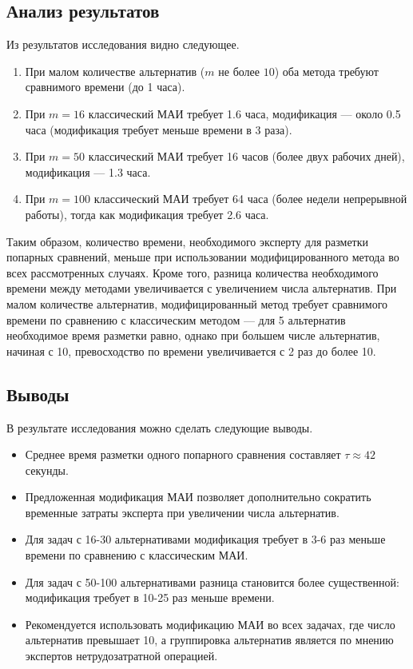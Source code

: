 \subsection{Анализ результатов}

Из результатов исследования видно следующее.
\begin{enumerate}
    \item При малом количестве альтернатив ($m$ не более $10$) оба метода требуют сравнимого времени (до 1 часа).
    \item При \(m = 16\) классический МАИ требует 1.6 часа, модификация --- около 0.5 часа (модификация требует меньше времени в 3 раза).
    \item При \(m = 50\) классический МАИ требует 16 часов (более двух рабочих дней), модификация --- 1.3 часа.
    \item При \(m = 100\) классический МАИ требует 64 часа (более недели непрерывной работы), тогда как модификация требует 2.6 часа.
\end{enumerate}

Таким образом, количество времени, необходимого эксперту для разметки попарных сравнений, меньше при использовании модифицированного метода во всех рассмотренных случаях.
Кроме того, разница количества необходимого времени между методами увеличивается с увеличением числа альтернатив.
При малом количестве альтернатив, модифицированный метод требует сравнимого времени по сравнению с классическим методом ---  для 5 альтернатив необходимое время разметки равно, однако при большем числе альтернатив, начиная с 10, превосходство по времени увеличивается с 2 раз до более 10.

\subsection*{Выводы}

В результате исследования можно сделать следующие выводы.

\begin{itemize}
    \item Среднее время разметки одного попарного сравнения составляет \(\tau \approx 42\) секунды.
    \item Предложенная модификация МАИ позволяет дополнительно сократить временные затраты эксперта при увеличении числа альтернатив.
    \item Для задач с 16-30 альтернативами модификация требует в 3-6 раз меньше времени по сравнению с классическим МАИ.
    \item Для задач с 50-100 альтернативами разница становится более существенной: модификация требует в 10-25 раз меньше времени.
    \item Рекомендуется использовать модификацию МАИ во всех задачах, где число альтернатив превышает 10, а группировка альтернатив является по мнению экспертов нетрудозатратной операцией.
\end{itemize}


